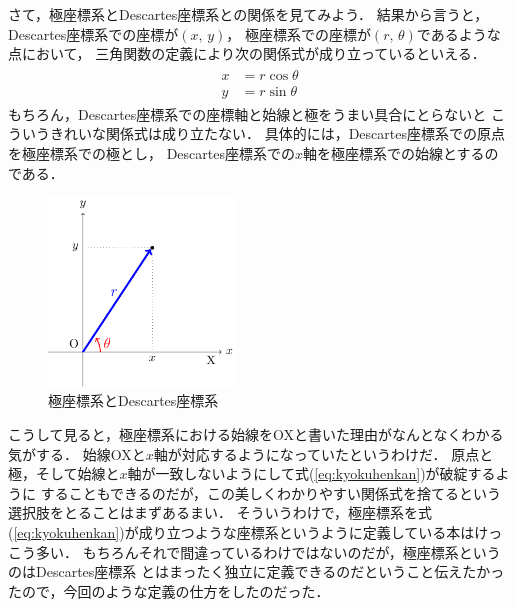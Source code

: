さて，極座標系とDescartes座標系との関係を見てみよう．
結果から言うと，Descartes座標系での座標が$(x, \, y)$，
極座標系での座標が$(r, \, \theta)$であるような点において，
三角関数の定義により次の関係式が成り立っているといえる．
\begin{align}
\begin{aligned}
x & = r \cos \theta \\
y & = r \sin \theta 
\label{eq:kyokuhenkan}
\end{aligned}
\end{align}
もちろん，Descartes座標系での座標軸と始線と極をうまい具合にとらないと
こういうきれいな関係式は成り立たない．
具体的には，Descartes座標系での原点を極座標系での極とし，
Descartes座標系での$x$軸を極座標系での始線とするのである．
\begin{figure}[h]
 \begin{center}
 \includegraphics[width=5cm]{picture/vecter12.pdf}
 \caption{極座標系とDescartes座標系}
\label{fig:kyokuDescartes}
 \end{center}
\end{figure}

こうして見ると，極座標系における始線をOXと書いた理由がなんとなくわかる気がする．
始線OXと$x$軸が対応するようになっていたというわけだ．
原点と極，そして始線と$x$軸が一致しないようにして式(\ref{eq:kyokuhenkan})が破綻するように
することもできるのだが，この美しくわかりやすい関係式を捨てるという選択肢をとることはまずあるまい．
そういうわけで，極座標系を式(\ref{eq:kyokuhenkan})が成り立つような座標系というように定義している本はけっこう多い．
もちろんそれで間違っているわけではないのだが，極座標系というのはDescartes座標系
とはまったく独立に定義できるのだということ伝えたかったので，今回のような定義の仕方をしたのだった．

